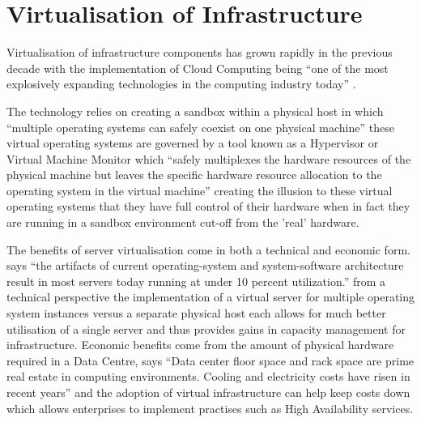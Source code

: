\documentclass[11pt]{report}
\begin{document}
\section{Virtualisation of Infrastructure}

Virtualisation of infrastructure components has grown rapidly in the previous decade with the implementation of Cloud Computing being ``one of the most explosively expanding
technologies in the computing industry today'' \citep{younge2011analysis}.

The technology relies on creating a sandbox within a physical host in which ``multiple operating systems can safely coexist on one physical machine'' \citep{mergen2006virtualization} these virtual operating systems are governed by a tool known as a Hypervisor or Virtual Machine Monitor which ``safely multiplexes the hardware resources of the physical machine but leaves the specific hardware resource allocation to the operating system in the virtual machine'' \citep{mergen2006virtualization} creating the illusion to these virtual operating systems that they have full control of their hardware when in fact they are running in a sandbox environment cut-off from the 'real' hardware. 

The benefits of server virtualisation come in both a technical and economic form. \citep{crosby2006virtualization} says ``the artifacts of current operating-system and system-software architecture result in most servers today running at under 10 percent utilization.'' from a technical perspective the implementation of a virtual server for multiple operating system instances versus a separate physical host each allows for much better utilisation of a single server and thus provides gains in capacity management for infrastructure. Economic benefits come from the amount of physical hardware required in a Data Centre, \citep{daniels2009server} says ``Data center floor space and rack space are prime real estate in computing environments. Cooling and electricity costs have risen in recent years'' and the adoption of virtual infrastructure can help keep costs down which allows enterprises to implement practises such as High Availability services.
\end{document}
